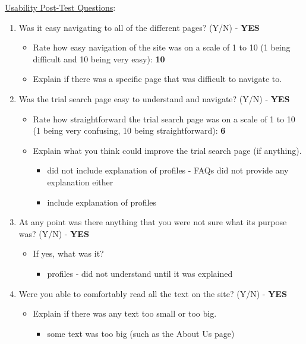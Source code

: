 \documentclass[12pt]{article}
\begin{document}
\noindent \underline{Usability Post-Test Questions}:
\begin{enumerate}
    \item Was it easy navigating to all of the different pages? (Y/N) - \textbf{YES}
      \begin{itemize}
        \item Rate how easy navigation of the site was on a scale of 1 to 10 (1 being difficult and 10 being very easy): \textbf{10}
        \item Explain if there was a specific page that was difficult to navigate to.
      \end{itemize}
      \item Was the trial search page easy to understand and navigate? (Y/N) - \textbf{YES}
      \begin{itemize}
        \item Rate how straightforward the trial search page was on a scale of 1 to 10 (1 being very confusing, 10 being straightforward): \textbf{6}
        \item Explain what you think could improve the trial search page (if anything).
        \begin{itemize}
          \item did not include explanation of profiles - FAQs did not provide any explanation either
          \item include explanation of profiles
        \end{itemize}
      \end{itemize}
    \item At any point was there anything that you were not sure what its purpose was? (Y/N) - \textbf{YES}
      \begin{itemize}
        \item If yes, what was it?
        \begin{itemize}
          \item profiles - did not understand until it was explained
        \end{itemize}
      \end{itemize}
    \item Were you able to comfortably read all the text on the site? (Y/N) - \textbf{YES}
      \begin{itemize}
        \item Explain if there was any text too small or too big.
        \begin{itemize}
          \item some text was too big (such as the About Us page)

\end{itemize}
\end{itemize}
\end{enumerate}
\end{document}
